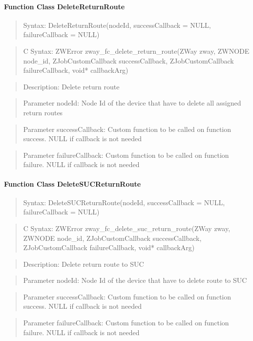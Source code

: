 \paragraph{Function Class DeleteReturnRoute}
\begin{quote}Syntax: DeleteReturnRoute(nodeId, successCallback = NULL, failureCallback = NULL)\end{quote}
\begin{quote}C Syntax: ZWError zway\_fc\_delete\_return\_route(ZWay zway, ZWNODE node\_id, ZJobCustomCallback successCallback, ZJobCustomCallback failureCallback, void* callbackArg)\end{quote}
\begin{quote}Description: Delete return route\end{quote}
\begin{quote}Parameter nodeId: Node Id of the device that have to delete all assigned return routes\end{quote}
\begin{quote}Parameter successCallback: Custom function to be called on function success. NULL if callback is not needed\end{quote}
\begin{quote}Parameter failureCallback: Custom function to be called on function failure. NULL if callback is not needed\end{quote}


\paragraph{Function Class DeleteSUCReturnRoute}
\begin{quote}Syntax: DeleteSUCReturnRoute(nodeId, successCallback = NULL, failureCallback = NULL)\end{quote}
\begin{quote}C Syntax: ZWError zway\_fc\_delete\_suc\_return\_route(ZWay zway, ZWNODE node\_id, ZJobCustomCallback successCallback, ZJobCustomCallback failureCallback, void* callbackArg)\end{quote}
\begin{quote}Description: Delete return route to SUC\end{quote}
\begin{quote}Parameter nodeId: Node Id of the device that have to delete route to SUC\end{quote}
\begin{quote}Parameter successCallback: Custom function to be called on function success. NULL if callback is not needed\end{quote}
\begin{quote}Parameter failureCallback: Custom function to be called on function failure. NULL if callback is not needed\end{quote}


